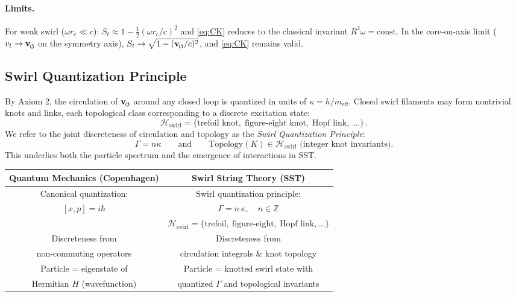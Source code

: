 \documentclass[11pt]{article}
\newcommand{\swirlarrow}{%
     \mathchoice{\mkern-2mu\scriptstyle\boldsymbol{\circlearrowleft}}%
                {\mkern-2mu\scriptstyle\boldsymbol{\circlearrowleft}}%
                {\mkern-2mu\scriptscriptstyle\boldsymbol{\circlearrowleft}}%
                {\mkern-2mu\scriptscriptstyle\boldsymbol{\circlearrowleft}}%
}
\newcommand{\vswirl}{\mathbf{v}_{\swirlarrow}}
\begin{document}
\paragraph{Limits.}
    For weak swirl ($\omega r_c\ll c$): $S_t \approx 1-\tfrac{1}{2}(\omega r_c/c)^2$ and \eqref{eq:CK} reduces to the classical invariant $R^2\omega=\text{const}$. In the core-on-axis limit ($v_t\to\vswirl$ on the symmetry axis), $S_t \to \sqrt{1-(\vswirl/c)^2}$, and \eqref{eq:CK} remains valid.

\subsection{Swirl Quantization Principle}
\label{sec:swirl_quantization}
By Axiom 2, the circulation of $\vswirl$ around any closed loop is quantized in units of $\kappa=h/m_{\text{eff}}$. Closed swirl filaments may form nontrivial knots and links, each topological class corresponding to a discrete excitation state:
\begin{equation}
    \mathcal{H}_{\text{swirl}} = \{\text{trefoil knot},\; \text{figure-eight knot},\; \text{Hopf link},\;\dots\}\,.
\end{equation}
We refer to the joint discreteness of circulation and topology as the \emph{Swirl Quantization Principle}:
\[
    \Gamma = n\kappa \qquad \text{and} \qquad \text{Topology}(K)\in \mathcal{H}_{\text{swirl}} \text{ (integer knot invariants)}.
\]
This underlies both the particle spectrum and the emergence of interactions in SST.

\begin{center}\setlength{\tabcolsep}{5pt}
    \begin{tabular}{|c|c|}
        \hline
        \textbf{Quantum Mechanics (Copenhagen)} & \textbf{Swirl String Theory (SST)} \\
        \hline
        Canonical quantization: & Swirl quantization principle: \\
        $[x, p] = i \hbar$ & $\displaystyle \Gamma = n\,\kappa,\quad n\in\mathbb{Z}$ \\[6pt]
        & $\displaystyle \mathcal{H}_{\text{swirl}} = \{\text{trefoil},\ \text{figure-eight},\ \text{Hopf link},\dots\}$ \\
        \hline
        Discreteness from & Discreteness from \\
        non-commuting operators & circulation integrals \& knot topology \\
        \hline
        Particle = eigenstate of & Particle = knotted swirl state with \\
        Hermitian $H$ (wavefunction) & quantized $\Gamma$ and topological invariants \\
        \hline
    \end{tabular}
\end{center}
\end{document}
